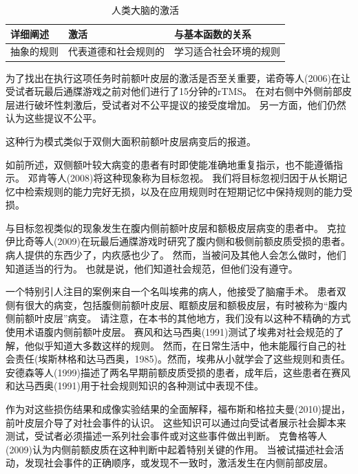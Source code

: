 \begin{table}[htbp] 
	\newcommand{\tabincell}[2]{\begin{tabular}{@{}#1@{}}#2\end{tabular}} %
	\centering
	\caption{人类大脑的激活\label{tab:9_9}}
	\renewcommand\arraystretch{1.5}	%
	\begin{tabular}{lll}
		\toprule
		详细阐述 & 激活 & 与基本函数的关系\\
		\midrule
		抽象的规则 & 代表道德和社会规则的 & 学习适合社会环境的规则  \\
		
		\bottomrule
		
	\end{tabular}%
\end{table}%


为了找出在执行这项任务时前额叶皮层的激活是否至关重要，诺奇等人(2006)在让受试者玩最后通牒游戏之前对他们进行了15分钟的rTMS。
在对右侧中外侧前部皮层进行破坏性刺激后，受试者对不公平提议的接受度增加。
另一方面，他们仍然认为这些提议不公平。


这种行为模式类似于双侧大面积前额叶皮层病变后的报道。


如前所述，双侧额叶较大病变的患者有时即使能准确地重复指示，也不能遵循指示。
邓肯等人(2008)将这种现象称为目标忽视。
我们将目标忽视归因于从长期记忆中检索规则的能力完好无损，以及在应用规则时在短期记忆中保持规则的能力受损。


与目标忽视类似的现象发生在腹内侧前额叶皮层和额极皮层病变的患者中。
克拉伊比奇等人(2009)在玩最后通牒游戏时研究了腹内侧和极侧前额皮质受损的患者。
病人提供的东西少了，内疚感也少了。
然而，当被问及其他人会怎么做时，他们知道适当的行为。
也就是说，他们知道社会规范，但他们没有遵守。


一个特别引人注目的案例来自一个名叫埃弗的病人，他接受了脑瘤手术。
患者双侧有很大的病变，包括腹侧前额叶皮层、眶额皮层和额极皮层，有时被称为“腹内侧前额叶皮层”病变。
请注意，在本书的其他地方，我们没有以这种不精确的方式使用术语腹内侧前额叶皮层。
赛风和达马西奥(1991)测试了埃弗对社会规范的了解，他似乎知道大多数这样的规则。
然而，在日常生活中，他未能履行自己的社会责任(埃斯林格和达马西奥，1985)。然而，埃弗从小就学会了这些规则和责任。
安德森等人(1999)描述了两名早期前额皮质受损的患者，成年后，这些患者在赛风和达马西奥(1991)用于社会规则知识的各种测试中表现不佳。


作为对这些损伤结果和成像实验结果的全面解释，福布斯和格拉夫曼(2010)提出，前叶皮层介导了对社会事件的认识。
这些知识可以通过向受试者展示社会脚本来测试，受试者必须描述一系列社会事件或对这些事件做出判断。
克鲁格等人(2009)认为内侧前额皮质在这种判断中起着特别关键的作用。
当被试描述社会活动，发现社会事件的正确顺序，或发现不一致时，激活发生在内侧前部皮层。


